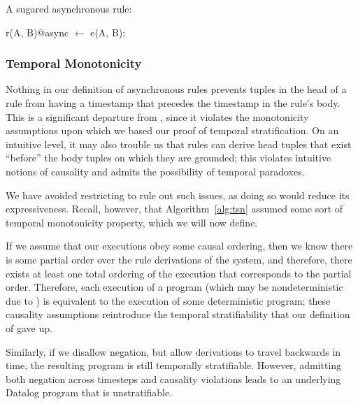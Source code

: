 \begin{example}
	A sugared asynchronous \lang rule:
	
\begin{Dedalus}
r(A, B)@async \(\leftarrow\) e(A, B);
\end{Dedalus}
\end{example}

\subsubsection{Temporal Monotonicity}


Nothing in our definition of asynchronous rules prevents tuples in the
head of a rule from having a timestamp that precedes the timestamp in
the rule's body. This is a significant departure from \slang, since it
violates the monotonicity assumptions upon which we based our proof of
temporal stratification.  On an intuitive level, it may also trouble
us that rules can derive head tuples that exist ``before'' the body
tuples on which they are grounded; this violates intuitive notions of
causality and admits the possibility of temporal paradoxes.

We have avoided restricting \lang to rule out such issues, as doing so
would reduce its expressiveness.  Recall, however, that
Algorithm~\ref{alg:tsn} assumed some sort of temporal monotonicity
property, which we will now define.

%

If we assume that our executions obey some causal ordering, then we
know there is some partial order over the rule derivations of the
system, and therefore, there exists at least one total ordering of the
execution that corresponds to the partial order.  Therefore, each
execution of a \lang program (which may be nondeterministic due to
) is equivalent to the execution of some deterministic \slang
program; these causality assumptions reintroduce the temporal stratifiability
that our definition of \lang gave up.

Similarly, if we disallow negation, but allow derivations to travel
backwards in time, the resulting \lang program is still temporally
stratifiable.  However, admitting both negation across timesteps and
causality violations leads to an underlying Datalog program that is
unstratifiable.

